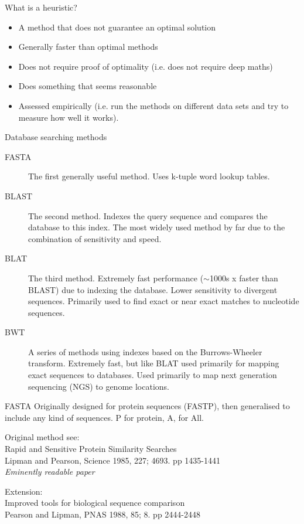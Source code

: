 \documentclass[pdf]{beamer}
\begin{document}
\begin{frame}{What is a heuristic?}
  \begin{itemize}
  \item A method that does not guarantee an optimal solution
  \item Generally faster than optimal methods
  \item Does not require proof of optimality (i.e. does not require deep
    maths)
  \item Does something that seems reasonable
  \item Assessed empirically (i.e. run the methods on different data sets and
    try to measure how well it works).
  \end{itemize}
\end{frame}

\begin{frame}{Database searching methods}
  \begin{description}
    \item[FASTA] The first generally useful method. Uses k-tuple word lookup
      tables.
    \item[BLAST] The second method. Indexes the query sequence and compares
      the database to this index. The most widely used method by far due to
      the combination of sensitivity and speed.
    \item[BLAT] The third method. Extremely fast performance ($\sim$1000s x
      faster than BLAST) due to indexing the database. Lower sensitivity to divergent
      sequences. Primarily used to find exact or near exact matches to
      nucleotide sequences.
    \item[BWT] A series of methods using indexes based on the Burrows-Wheeler
      transform. Extremely fast, but like BLAT used primarily for mapping
      exact sequences to databases. Used primarily to map next generation
      sequencing (NGS) to genome locations.
  \end{description}
\end{frame}

\begin{frame}{FASTA}
  Originally designed for protein sequences (FASTP), then generalised to
  include any kind of sequences. P for protein, A, for All.

  Original method see:\\
  Rapid and Sensitive Protein Similarity Searches\\
  Lipman and Pearson, Science 1985, 227; 4693. pp 1435-1441\\
  \emph{Eminently readable paper}

  Extension:\\
  Improved tools for biological sequence comparison\\
  Pearson and Lipman, PNAS 1988, 85; 8. pp 2444-2448 
\end{frame}
\end{document}
